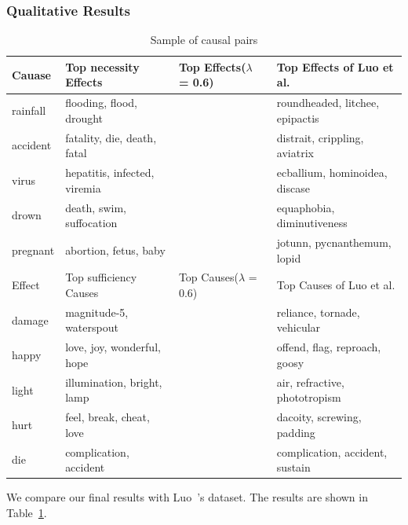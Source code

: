 \subsubsection{Qualitative Results}
\begin{table}[!ht]
	\caption{Sample of causal pairs}
	\label{tab:qualitative}
	\centering
	\small
		\begin{tabular}{|l|l|l|l|}
			\hline 
			Cauase & Top necessity Effects & Top Effects($\lambda$ = 0.6) & Top Effects of Luo et al. \cite{luo2016commonsense} \\
			\hline
			rainfall & flooding, flood, drought& &roundheaded, litchee, epipactis\\
			accident & fatality, die, death, fatal & & distrait, crippling, aviatrix\\
			virus & hepatitis, infected, viremia&  & ecballium, hominoidea, discase\\
			drown & death, swim, suffocation& & equaphobia, diminutiveness\\
			pregnant & abortion, fetus, baby&& jotunn, pycnanthemum, lopid \\
			\hline 
			\hline
			Effect & Top sufficiency Causes & Top Causes($\lambda$ = 0.6) & Top Causes of Luo et al. \cite{luo2016commonsense} \\
			\hline
			damage & magnitude-5, waterspout& & reliance, tornade, vehicular\\
			happy & love, joy, wonderful, hope& &offend, flag, reproach, goosy\\
			light & illumination, bright, lamp& & air, refractive, phototropism\\
			hurt & feel, break, cheat, love& & dacoity, screwing, padding\\
			die & complication, accident& & complication, accident, sustain\\
			\hline
	\end{tabular}
\end{table}
We compare our final results with Luo~\cite{luo2016commonsense}'s dataset. The results are shown in Table~\ref{tab:qualitative}.




